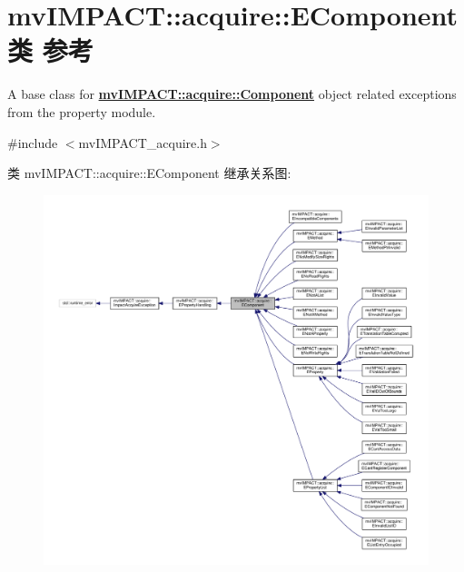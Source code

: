 \hypertarget{classmv_i_m_p_a_c_t_1_1acquire_1_1_e_component}{\section{mv\+I\+M\+P\+A\+C\+T\+:\+:acquire\+:\+:E\+Component类 参考}
\label{classmv_i_m_p_a_c_t_1_1acquire_1_1_e_component}
}


A base class for {\bfseries \hyperlink{classmv_i_m_p_a_c_t_1_1acquire_1_1_component}{mv\+I\+M\+P\+A\+C\+T\+::acquire\+::\+Component}} object related exceptions from the property module.  




{\ttfamily \#include $<$mv\+I\+M\+P\+A\+C\+T\+\_\+acquire.\+h$>$}



类 mv\+I\+M\+P\+A\+C\+T\+:\+:acquire\+:\+:E\+Component 继承关系图\+:
\nopagebreak
\begin{figure}[H]
\begin{center}
\leavevmode
\includegraphics[width=350pt]{classmv_i_m_p_a_c_t_1_1acquire_1_1_e_component__inherit__graph}
\end{center}
\end{figure}


